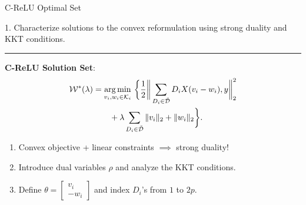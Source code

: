 \documentclass[usenames,dvipsnames,mathserif,notheorems]{beamer}
\newcommand{\horizontalrule}{
	{
			\vspace{-0.5em}
			\center \rule{\textwidth}{0.1em}
			\vspace{-0.2em}
		}
}
\newcommand{\good}[1]{\textcolor{good}{#1}}
\begin{document}
\begin{frame}{C-ReLU Optimal Set}

	{\raggedright
		\large
		1. Characterize solutions to the \good{convex reformulation}
		using strong duality and KKT conditions.
		\vspace{3ex}
		\pause
	}

	\horizontalrule

	\textbf{C-ReLU Solution Set}:
	\[
		\begin{aligned}
			\mathcal{W}^*(\lambda) & =
			\mathop{\rm arg\,min}_{v_i, w_i \in \mathcal{K}_i} \, \bigg\{
			\frac 1 2 \bigg\|\sum_{D_i \in \tilde {\mathcal{D}}} D_i X (v_i - w_i), y\bigg\|_2^2                    \\
			                & \quad \quad + \lambda\sum_{D_i \in \tilde {\mathcal{D}}}\|v_i\|_2+\|w_i\|_2
			\bigg\}.
		\end{aligned}
	\]

	\pause

	\begin{enumerate}
		\item Convex objective + linear constraints \( \implies \) strong duality!
		      \pause
		\item Introduce dual variables \( \rho \) and analyze the KKT conditions.
		      \pause
		\item Define
		      \(
		      \theta =
		      \begin{bmatrix}
			      v_i \\
			      -w_i
		      \end{bmatrix}
		      \)
		      and index \( D_i \)'s from \( 1 \) to \( 2p \).
	\end{enumerate}

\end{frame}
\end{document}
